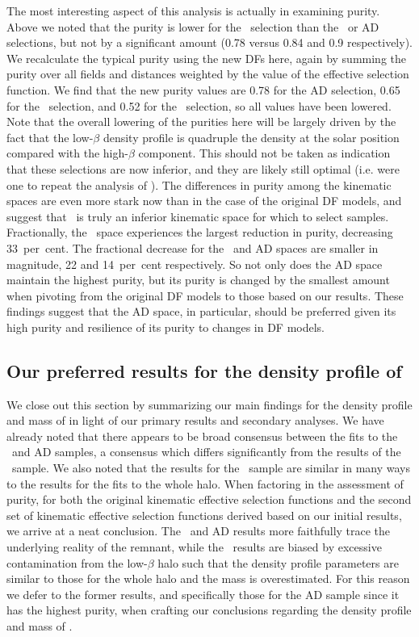The most interesting aspect of this analysis is actually in examining purity. Above we noted that the purity is lower for the \JRLz\ selection than the \eLz\ or AD selections, but not by a significant amount (0.78 versus 0.84 and 0.9 respectively). We recalculate the typical purity using the new DFs here, again by summing the purity over all fields and distances weighted by the value of the effective selection function. We find that the new purity values are 0.78 for the AD selection, 0.65 for the \eLz\ selection, and 0.52 for the \JRLz\ selection, so all values have been lowered. Note that the overall lowering of the purities here will be largely driven by the fact that the low-$\beta$ density profile is quadruple the density at the solar position compared with the high-$\beta$ component. This should not be taken as indication that these selections are now inferior, and they are likely still optimal (i.e. were one to repeat the analysis of \cite{lane22}). The differences in purity among the kinematic spaces are even more stark now than in the case of the original DF models, and suggest that \JRLz\ is truly an inferior kinematic space for which to select \gse samples. Fractionally, the \JRLz\ space experiences the largest reduction in purity, decreasing 33~per~cent. The fractional decrease for the \eLz\ and AD spaces are smaller in magnitude, 22 and 14~per~cent respectively. So not only does the AD space maintain the highest purity, but its purity is changed by the smallest amount when pivoting from the original DF models to those based on our results. These findings suggest that the AD space, in particular, should be preferred given its high purity and resilience of its purity to changes in DF models.

\subsection{Our preferred results for the density profile of \gse}

We close out this section by summarizing our main findings for the density profile and mass of \gse in light of our primary results and secondary analyses. We have already noted that there appears to be broad consensus between the fits to the \eLz\ and AD samples, a consensus which differs significantly from the results of the \JRLz\ sample. We also noted that the results for the \JRLz\ sample are similar in many ways to the results for the fits to the whole halo. When factoring in the assessment of purity, for both the original kinematic effective selection functions and the second set of kinematic effective selection functions derived based on our initial results, we arrive at a neat conclusion. The \eLz\ and AD results more faithfully trace the underlying reality of the \gse remnant, while the \JRLz\ results are biased by excessive contamination from the low-$\beta$ halo such that the density profile parameters are similar to those for the whole halo and the mass is overestimated. For this reason we defer to the former results, and specifically those for the AD sample since it has the highest purity, when crafting our conclusions regarding the density profile and mass of \gse.


